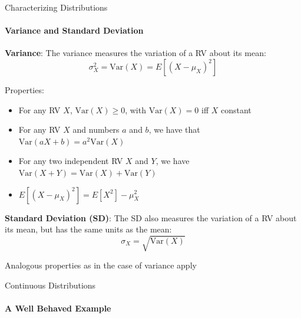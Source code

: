 {    

    \begin{frame}{Characterizing Distributions}
        \framesubtitle{Variance and Standard Deviation}

        \begin{boxed}
            \textbf{Variance}:
            The variance measures the variation of a RV about its mean:
            $$\sigma_X^2 = \mathrm{Var}(X) = E\left[(X-\mu_X)^2\right]$$
        \end{boxed}

        Properties:
        \begin{itemize}
            \item For any RV $X$, $\mathrm{Var}(X) \ge 0$, with $\mathrm{Var}(X) = 0$ iff $X$ constant
            \item For any RV $X$ and numbers $a$ and $b$, we have that $\mathrm{Var}(aX+b) = a^2\mathrm{Var}(X)$
            \item For any two independent RV $X$ and $Y$, we have $\mathrm{Var}(X+Y) = \mathrm{Var}(X) + \mathrm{Var}(Y)$
            \item $\displaystyle E\left[(X-\mu_X)^2\right] = E[X^2] - \mu_X^2$
        \end{itemize}

        \begin{boxed}
            \textbf{Standard Deviation (SD)}:
            The SD also measures  the variation of a RV about its mean, but has the same units as the mean:
            $$\sigma_X = \sqrt{\mathrm{Var}(X)}$$
        \end{boxed}
        Analogous properties as in the case of variance apply
    \end{frame}

    \begin{frame}{Continuous Distributions}
        \framesubtitle{A Well Behaved Example}


\end{frame}}

